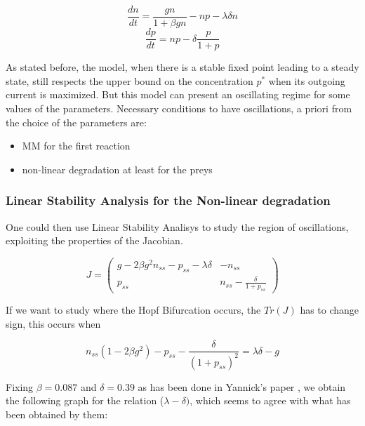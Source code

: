 \documentclass{article}
\begin{document}
	\begin{equation}
		\frac{dn}{dt}=\frac{g n}{1+\beta g n}-n p-\lambda \delta n
	\end{equation}
	\begin{equation}
		\frac{dp}{dt}=n p-\delta \frac{p}{1+p}
	\end{equation}
	
	As stated before, the model, when there is a stable fixed point leading to a steady state, still respects the upper bound on the concentration $p^*$ when its outgoing current is maximized. But this model can present an oscillating regime for some values of the parameters. Necessary conditions to have oscillations, a priori from the choice of the parameters are:
	
	\begin{itemize}
		\item MM for the first reaction
		\item non-linear degradation at least for the preys
	\end{itemize}
	
	\subsubsection{Linear Stability Analysis for the Non-linear degradation}
	One could then use Linear Stability Analisys to study the region of oscillations, exploiting the properties of the Jacobian. 
	
	$$J= \begin{pmatrix}
		g-2\beta g^2 n_{ss}-p_{ss}-\lambda \delta & -n_{ss}\\ p_{ss} & n_{ss}-\frac{\delta}{1+p_{ss}}
	\end{pmatrix}$$
	
	If we want to study where the Hopf Bifurcation occurs, the $Tr(J)$ has to change sign, this occurs when
	
	$$n_{ss}(1-2 \beta  g^2)-p_{ss}-\frac{\delta}{(1+p_{ss})^2}=\lambda \delta -g$$
	
	Fixing $\beta=0.087$ and $\delta=0.39$ as has been done in Yannick's paper \cite{2}, we obtain the following graph for the relation ($\lambda - \delta)$, which seems to agree with what has been obtained by them:
	
	\hfill \break 
	
\end{document}
